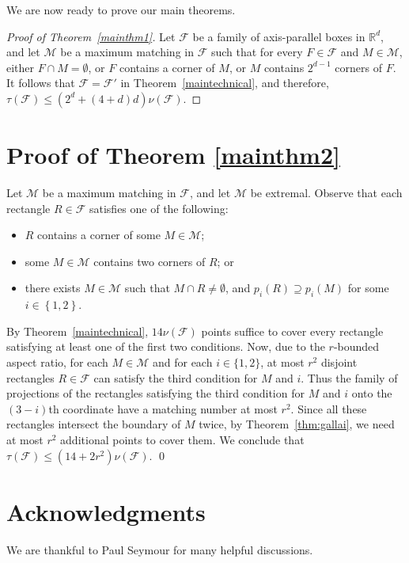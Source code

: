 \documentclass[12pt]{amsart}
\theoremstyle{plain}
\theoremstyle{definition}
\theoremstyle{remark}
\newcommand{\F}{\mathcal{F}}
\newcommand{\M}{\mathcal{M}}
\newcommand{\R}{\mathbb{R}}
\newcommand{\sset}[1]{\left\{#1\right\}}
\begin{document}
We are now ready to prove our main theorems. 
\begin{proof}[Proof of Theorem~\ref{mainthm1}] Let $\F$ be a family of axis-parallel boxes in $\R^d$, and let $\M$ be a maximum matching in $\F$ such that for every $F \in \F$ and $M \in \M$, either $F \cap M = \emptyset$, or $F$ contains a corner of $M$, or $M$ contains $2^{d-1}$ corners of $F$. It follows that $\F = \F'$ in Theorem~\ref{maintechnical}, and therefore, $\tau(\F) \leq (2^d+(4+d)d) \nu(\F)$. 
\end{proof}

\section{Proof of Theorem \ref{mainthm2}}

Let $\M$ be a maximum matching in $\F$, and let $\M$ be extremal. Observe that each rectangle $R \in \F$ satisfies one of the following:
\begin{itemize}
\item $R$ contains a corner of some $M \in \M$; 
\item some $M \in \M$ contains two corners of $R$; or
\item there exists $M \in \M$ such that $M \cap R \neq \emptyset$, and $p_i(R) \supseteq p_i(M)$ for some $i \in \sset{1,2}$.
\end{itemize}
By Theorem~\ref{maintechnical}, $14 \nu(\F)$ points suffice to cover every rectangle satisfying at least one of the first two conditions. Now, due to the $r$-bounded aspect ratio, for each $M \in 
\M$ and for each $i\in \{1,2\}$, at most $r^2$ disjoint rectangles $R\in \F$ can satisfy the third condition for $M$ and $i$. Thus the family of projections of the rectangles satisfying the third condition for $M$ and $i$ onto the $(3-i)$th coordinate have a matching number at most $r^2$. Since all these rectangles intersect the boundary of $M$ twice,  by Theorem~\ref{thm:gallai}, we need at most $r^2$ additional points to cover them. We conclude that $\tau(\F) \leq (14+2r^2) \nu(\F)$. 
\qed

\section*{Acknowledgments}
We are thankful to Paul Seymour for many helpful discussions. 
{}

\end{document}
